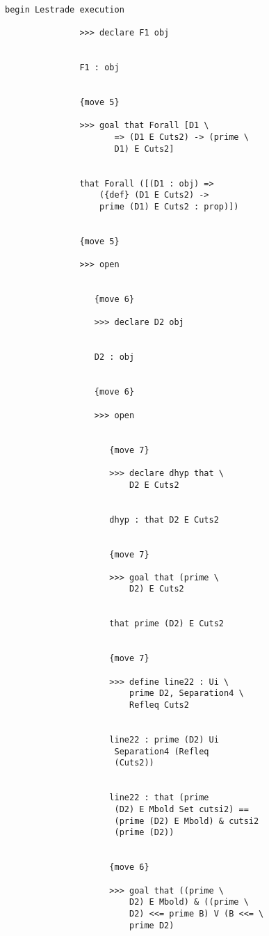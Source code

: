 \documentclass[12pt]{article}
\begin{document}
\begin{verbatim}

begin Lestrade execution

               >>> declare F1 obj


               F1 : obj


               {move 5}

               >>> goal that Forall [D1 \
                      => (D1 E Cuts2) -> (prime \
                      D1) E Cuts2]


               that Forall ([(D1 : obj) => 
                   ({def} (D1 E Cuts2) -> 
                   prime (D1) E Cuts2 : prop)])


               {move 5}

               >>> open


                  {move 6}

                  >>> declare D2 obj


                  D2 : obj


                  {move 6}

                  >>> open


                     {move 7}

                     >>> declare dhyp that \
                         D2 E Cuts2


                     dhyp : that D2 E Cuts2


                     {move 7}

                     >>> goal that (prime \
                         D2) E Cuts2


                     that prime (D2) E Cuts2


                     {move 7}

                     >>> define line22 : Ui \
                         prime D2, Separation4 \
                         Refleq Cuts2


                     line22 : prime (D2) Ui 
                      Separation4 (Refleq 
                      (Cuts2))


                     line22 : that (prime 
                      (D2) E Mbold Set cutsi2) == 
                      (prime (D2) E Mbold) & cutsi2 
                      (prime (D2))


                     {move 6}

                     >>> goal that ((prime \
                         D2) E Mbold) & ((prime \
                         D2) <<= prime B) V (B <<= \
                         prime D2)



\end{verbatim}
\end{document}
